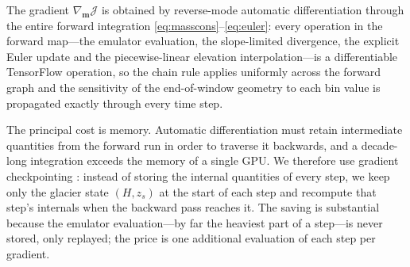 The gradient
$\nabla_{\mathbf{m}}\mathcal{J}$ is obtained by reverse-mode automatic
differentiation \citep{baydin2018} through the entire forward integration
\eqref{eq:masscons}--\eqref{eq:euler}: every operation in the forward map---the
emulator evaluation, the slope-limited divergence, the explicit Euler update and
the piecewise-linear elevation interpolation---is a differentiable TensorFlow
\citep{abadi2016} operation, so the chain rule applies uniformly across the forward
graph and the sensitivity of the end-of-window geometry to each bin value is
propagated exactly through every time step.

The principal cost is memory. Automatic differentiation must retain intermediate
quantities from the forward run in order to traverse it backwards, and a decade-long
integration exceeds the memory of a single GPU. We therefore use gradient
checkpointing \citep{griewank2000, chen2016}: instead of storing the internal
quantities of every step, we keep only the glacier state $(H, z_s)$ at the start of
each step and recompute that step's internals when the backward pass reaches it. The
saving is substantial because the emulator evaluation---by far the heaviest part of a
step---is never stored, only replayed; the price is one additional evaluation of each
step per gradient.